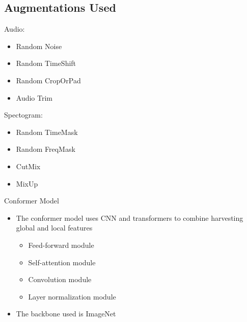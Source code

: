 \documentclass[hyperref={pdfpagelabels=false}, color=table]{beamer}
\begin{document}
    \subsection{Augmentations Used}
    \begin{frame}
        Audio:
        \begin{itemize}
            \item Random Noise
            \item Random TimeShift
            \item Random CropOrPad
            \item Audio Trim
        \end{itemize}

        Spectogram:
        \begin{itemize}
            \item Random TimeMask
            \item Random FreqMask
            \item CutMix
            \item MixUp
        \end{itemize}
    \end{frame}

    \begin{frame}{Conformer Model}


        \begin{itemize}
            \item The conformer model uses CNN and transformers to combine harvesting global and local features
            \begin{itemize}
            \item Feed-forward module
            \item Self-attention module
            \item Convolution module
            \item Layer normalization module
            \end{itemize}
            \item The backbone used is ImageNet
        \end{itemize}
    \end{frame}
\end{document}
